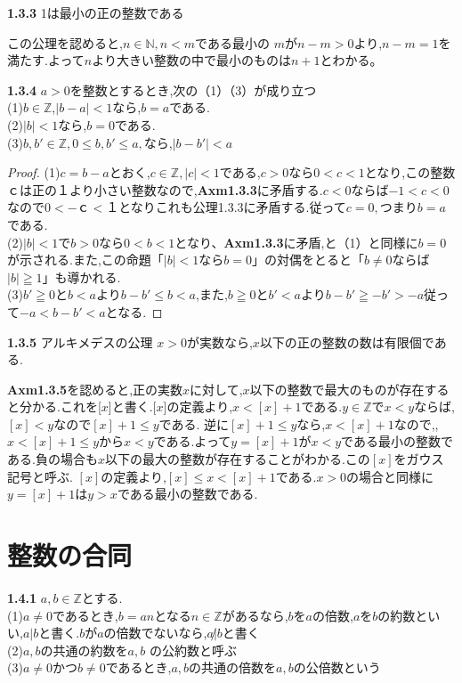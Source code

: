 \begin{axm}{\rm\bf1.3.3}
1は最小の正の整数である
\end{axm}
この公理を認めると,$n\in\mathbb{N},n<m$である最小の
$m$が$n-m>0$より,$n-m=1$を満たす.よって$n$より大きい整数の中で最小のものは$n+1$とわかる。


\begin{prop}{\rm\bf1.3.4}
\quad $a>0$を整数とするとき,次の（1）（3）が成り立つ
\\(1)$b\in\mathbb{Z}$,$|b-a|<1$なら,$b=a$である.
\\(2)$|b|<1$なら,$b=0$である.
\\(3)$b,b'\in\mathbb{Z},0\leq b,b'\leq a,$なら,$|b-b'|<a$
\end{prop}

\begin{proof}
(1)\quad $c=b-a$とおく,$c\in\mathbb{Z},|c|<1$である,$c>0$なら$0<c<1$となり,この整数$ｃ$は正の１より小さい整数なので,\textbf{Axm1.3.3}に矛盾する.$c<0$ならば$-1<c<0$なので$0<-ｃ<１$となりこれも公理1.3.3に矛盾する.従って$c=0,$つまり$b=a$である.
\\(2)\quad $|b|<1$で$b>0$なら$0<b<1$となり、\textbf{Axm1.3.3}に矛盾,と（1）と同様に$b=0$が示される.また,この命題「$|b|<1$なら$b=0$」の対偶をとると「$b\ne0$ならば$|b|\geqq1$」も導かれる.
\\(3)\quad $b'\geqq0$と$b<a$より$b-b' \leq b<a$,また,$b\geqq0$と$b'<a$より$b-b'\geqq-b'>-a$従って$-a<b-b'<a$となる.
\end{proof}

\begin{axm}{\rm\bf1.3.5}
アルキメデスの公理 \quad $x>0$が実数なら,$x$以下の正の整数の数は有限個である.
\end{axm}

\textbf{Axm1.3.5}を認めると,正の実数$x$に対して,$x$以下の整数で最大のものが存在すると分かる.これを[$x$]と書く.[$x$]の定義より,$x<[x]+1$である.$y\in\mathbb{Z}$で$x<y$ならば,$[x]<y$なので$[x]+1\leq y$である.
逆に$[x]+1\leq y$なら,$x<[x]+1$なので,,$x<[x]+1\leq yからx<y$である.よって$y=[x]+1$が$x<y$である最小の整数である.負の場合も$x$以下の最大の整数が存在することがわかる.この$[x]$をガウス記号と呼ぶ.
$[x]$の定義より,$[x]\leq x<[x]+1$である.$x>0$の場合と同様に$y=[x]+1$は$y>x$である最小の整数である.


\section{整数の合同}

\begin{dfn}{\rm\bf1.4.1}
$a,b\in\mathbb{Z}$とする.
\\(1)$a\ne0$であるとき,$b=an$となる$n\in\mathbb{Z}$があるなら,$b$を$a$の倍数,$a$を$b$の約数といい,$a|b$と書く.$b$が$a$の倍数でないなら,$a\not|b$と書く
\\(2)$a,b$の共通の約数を$a,b$ の公約数と呼ぶ
\\(3)$a\ne0$かつ$b\ne0$であるとき,$a,b$の共通の倍数を$a,b$の公倍数という
\end{dfn}

